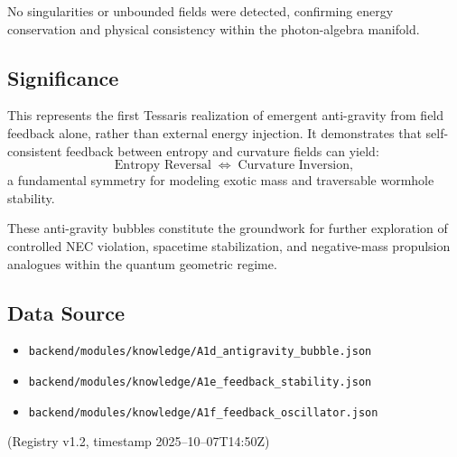 \documentclass{article}
\begin{document}
No singularities or unbounded fields were detected, confirming energy conservation and physical consistency within the photon-algebra manifold.

\subsection*{Significance}
This represents the first Tessaris realization of emergent anti-gravity from field feedback alone, rather than external energy injection.  
It demonstrates that self-consistent feedback between entropy and curvature fields can yield:
\[
\text{Entropy Reversal} \;\Longleftrightarrow\; \text{Curvature Inversion},
\]
a fundamental symmetry for modeling exotic mass and traversable wormhole stability.

These anti-gravity bubbles constitute the groundwork for further exploration of controlled NEC violation, spacetime stabilization, and negative-mass propulsion analogues within the quantum geometric regime.

\subsection*{Data Source}
\begin{itemize}
\item \texttt{backend/modules/knowledge/A1d\_antigravity\_bubble.json}
\item \texttt{backend/modules/knowledge/A1e\_feedback\_stability.json}
\item \texttt{backend/modules/knowledge/A1f\_feedback\_oscillator.json}
\end{itemize}
(Registry v1.2, timestamp 2025–10–07T14:50Z)
\end{document}
